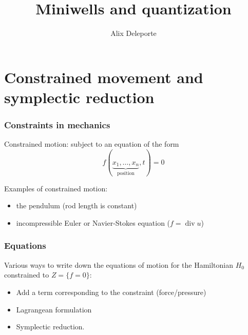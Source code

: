 \documentclass[mathserif]{beamer}
\title{Miniwells and quantization}
\author[Alix Deleporte]{Alix Deleporte}
\institute[IRMA]{Institut de Recherche Mathématique
  Avancée\\Université de Strasbourg}
\begin{document}
\beamertemplatenavigationsymbolsempty

    \expandafter\def\expandafter\insertshorttitle\expandafter{%
       \insertshorttitle\hfill%
       \insertframenumber}


\begin{frame}
	\titlepage
      \end{frame}

\section{Constrained movement and symplectic reduction}

\begin{frame}
  \frametitle{Constraints in mechanics}
  Constrained motion: subject to an equation of the form
  \[
    f(\underbrace{x_1,\ldots,x_n}_{\text{position}},t)=0
    \]
    \vfill
    
  Examples of constrained motion:
  \begin{itemize}
  \item the pendulum (rod length is constant)
  \item incompressible Euler or Navier-Stokes equation ($f=\mathop{div} u$)
    \end{itemize}
  \end{frame}

  \begin{frame}
    \frametitle{Equations}
    Various ways to write down the equations of motion for the
    Hamiltonian $H_0$ constrained to $Z=\{f=0\}$:
    \begin{itemize}
    \item Add a term corresponding to the constraint (force/pressure)
    \item Lagrangean formulation
    \item Symplectic reduction.
    \end{itemize}

    \end{frame}
\end{document}
